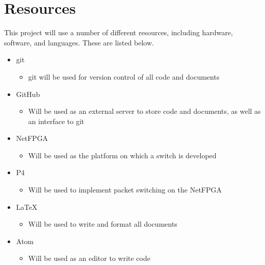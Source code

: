 \documentclass[12pt, a4paper, twoside, onecolumn]{article}
\begin{document}
\section{Resources}
\label{resources}
This project will use a number of different resources, including hardware, software, and languages. These are listed below.
\begin{itemize}
  \item git \cite{git}
    \begin{itemize}
      \item git will be used for version control of all code and documents
    \end{itemize}
  \item GitHub \cite{github}
    \begin{itemize}
      \item Will be used as an external server to store code and documents, as well as an interface to git
    \end{itemize}
  \item NetFPGA \cite{NetFPGA}
    \begin{itemize}
      \item Will be used as the platform on which a switch is developed
    \end{itemize}
  \item P4 \cite{P4}
    \begin{itemize}
      \item Will be used to implement packet switching on the NetFPGA
    \end{itemize}
  \item LaTeX \cite{latex}
    \begin{itemize}
      \item Will be used to write and format all documents
    \end{itemize}
  \item Atom \cite{atom}
    \begin{itemize}
      \item Will be used as an editor to write code
    \end{itemize}
\end{itemize}




\end{document}
